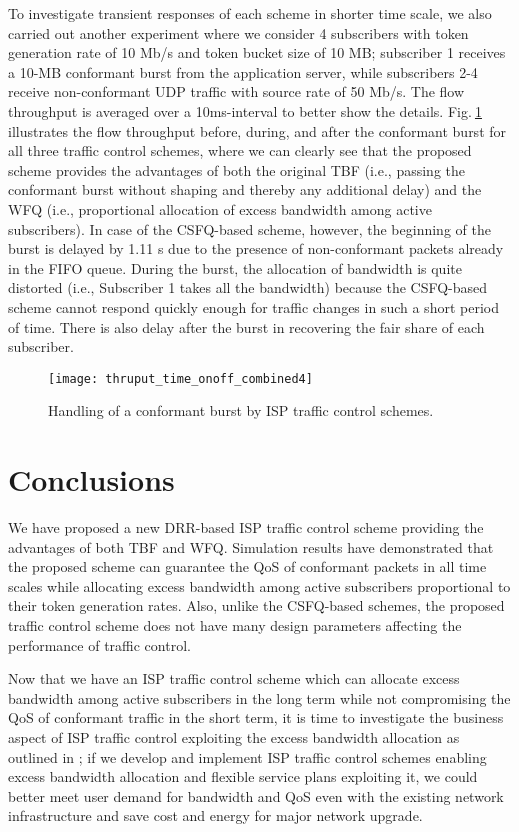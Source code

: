 \documentclass[conference,twoside,final]{IEEEtran}
\begin{document}
To investigate transient responses of each scheme in shorter time scale, we also
carried out another experiment where we consider 4 subscribers with token
generation rate of 10 Mb/s and token bucket size of 10 MB; subscriber 1 receives
a 10-MB conformant burst from the application server, while subscribers 2-4
receive non-conformant UDP traffic with source rate of 50 Mb/s. The flow
throughput is averaged over a 10ms-interval to better show the
details. Fig.\(~\)\ref{fg:thruput_time_onoff} illustrates the flow throughput
before, during, and after the conformant burst for all three traffic control
schemes, where we can clearly see that the proposed scheme provides the
advantages of both the original TBF (i.e., passing the conformant burst without
shaping and thereby any additional delay) and the WFQ (i.e., proportional
allocation of excess bandwidth among active subscribers). In case of the
CSFQ-based scheme, however, the beginning of the burst is delayed by 1.11 s due
to the presence of non-conformant packets already in the FIFO queue. During the
burst, the allocation of bandwidth is quite distorted (i.e., Subscriber 1 takes
all the bandwidth) because the CSFQ-based scheme cannot respond quickly enough
for traffic changes in such a short period of time. There is also delay after
the burst in recovering the fair share of each subscriber.
\begin{figure}[!htb]
    \begin{center}
        \texttt{[image: thruput\_time\_onoff\_combined4]}
    \end{center}
    \caption{Handling of a conformant burst by ISP traffic control schemes.}
    \label{fg:thruput_time_onoff}
\end{figure}

\section{Conclusions}
\label{sec-4}
We have proposed a new DRR-based ISP traffic control scheme providing the
advantages of both TBF and WFQ. Simulation results have demonstrated that the
proposed scheme can guarantee the QoS of conformant packets in all time scales
while allocating excess bandwidth among active subscribers proportional to their
token generation rates. Also, unlike the CSFQ-based schemes, the proposed
traffic control scheme does not have many design parameters affecting the
performance of traffic control.

Now that we have an ISP traffic control scheme which can allocate excess
bandwidth among active subscribers in the long term while not compromising the
QoS of conformant traffic in the short term, it is time to investigate the
business aspect of ISP traffic control exploiting the excess bandwidth
allocation as outlined in \cite{Kim:14-5}; if we develop and implement ISP
traffic control schemes enabling excess bandwidth allocation and flexible
service plans exploiting it, we could better meet user demand for bandwidth and
QoS even with the existing network infrastructure and save cost and energy for
major network upgrade.
\end{document}

